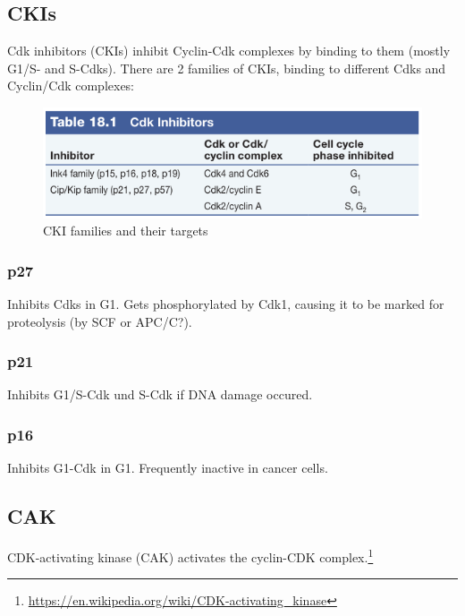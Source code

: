 \documentclass{article}
\begin{document}
	\subsection{CKIs}
	Cdk inhibitors (CKIs) inhibit Cyclin-Cdk complexes by binding to them (mostly G1/S- and S-Cdks). There are 2 families of CKIs, binding to different Cdks and Cyclin/Cdk complexes:
	
	\begin{figure}[H]
		\centering
		\includegraphics[width=\linewidth]{ckis_cooper.png}
		\caption{CKI families and their targets}
	\end{figure}

	\subsubsection{p27}
	Inhibits Cdks in G1. Gets phosphorylated by Cdk1, causing it to be marked for proteolysis (by SCF or APC/C?). 
	
	\subsubsection{p21}
	Inhibits G1/S-Cdk und S-Cdk if DNA damage occured.
	
	\subsubsection{p16}
	Inhibits G1-Cdk in G1. Frequently inactive in cancer cells.
	
	\subsection{CAK}
	CDK-activating kinase (CAK) activates the cyclin-CDK complex.\footnote{\url{https://en.wikipedia.org/wiki/CDK-activating_kinase}}
\end{document}
